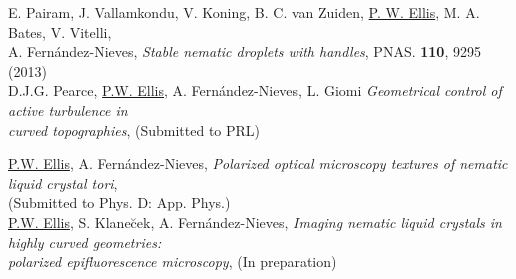 \documentclass[10pt]{article}
\newenvironment{changemargin}[2]{%
  \list{}{\rightmargin#2\leftmargin#1
    \parsep=0pt\topsep=1pt\partopsep=0pt}
\item[]} {\endlist}
\newenvironment{indentmore}{\begin{changemargin}{10pt}{0cm}}{\end{changemargin}}
\begin{document}
\begin{indentmore}
E. Pairam, J. Vallamkondu, V. Koning, B. C. van Zuiden, \underline{P. W. Ellis}, M. A. Bates, V. Vitelli, \\ \hspace*{15pt}A. Fern\'{a}ndez-Nieves, \emph{Stable nematic droplets with handles}, PNAS. {\bf 110}, 9295 (2013)\\

D.J.G. Pearce, \underline{P.W. Ellis}, A. Fern\'{a}ndez-Nieves, L. Giomi \emph{Geometrical control of active turbulence in \\ \hspace*{15pt} curved topographies}, (Submitted to PRL)\\

\newpage

\underline{P.W. Ellis}, A. Fern\'{a}ndez-Nieves, \emph{Polarized optical microscopy textures of nematic liquid crystal tori}, \\ \hspace*{15pt} (Submitted to Phys. D: App. Phys.)\\

\underline{P.W. Ellis}, S. Klane\u{c}ek, A. Fern\'{a}ndez-Nieves, \emph{Imaging nematic liquid crystals in highly curved geometries: \\ \hspace*{15pt} polarized epifluorescence microscopy}, (In preparation)\\

\end{indentmore}
\end{document}
